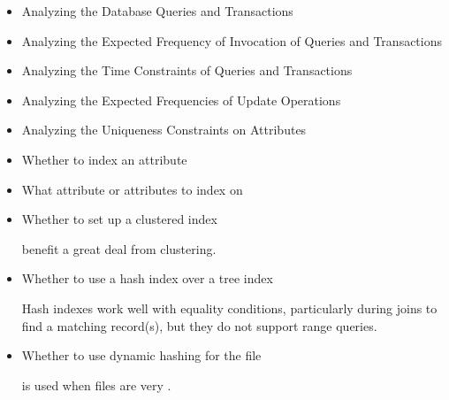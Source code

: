     \par {}
    \par {}



    \begin{itemize}
      \item Analyzing the Database Queries and Transactions
      \item Analyzing the Expected Frequency of Invocation of Queries and
      Transactions
      \item Analyzing the Time Constraints of Queries and Transactions
      \item Analyzing the Expected Frequencies of Update Operations
      \item Analyzing the Uniqueness Constraints on Attributes
    \end{itemize}
  
    \begin{itemize}
      \item Whether to index an attribute
      \item What attribute or attributes to index on
      \item Whether to set up a clustered index
        \par {} benefit a great deal from clustering.
      \item Whether to use a hash index over a tree index
        \par Hash indexes work well with equality conditions, particularly during joins to find a matching record(s), but they do not
        support range queries.
      \item Whether to use dynamic hashing for the file
        \par {} is used when files are very .
    \end{itemize}